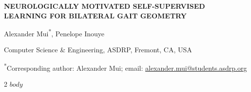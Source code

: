 \documentclass[11pt,letterpaper]{article}
\begin{document}
\fontsize{11}{12.5}\selectfont
{\centering
  {\bfseries\MakeUppercase{Neurologically Motivated Self-Supervised}\\
   \MakeUppercase{Learning for Bilateral Gait Geometry}\par}
  Alexander Mui\textsuperscript{*}, Penelope Inouye\par
  Computer Science \& Engineering, ASDRP, Fremont, CA, USA\par
  \textsuperscript{*}Corresponding author: Alexander Mui; email: \href{mailto:alexander.mui@students.asdrp.org}{alexander.mui@students.asdrp.org}\par
}
\begin{multicols}{2}
$body$
\end{multicols}
\end{document}
